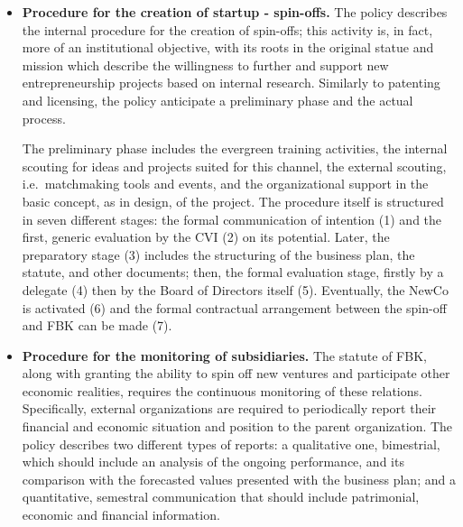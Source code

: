 \begin{itemize}
\item \textbf{Procedure for the creation of startup - spin-offs.} The policy describes the internal procedure for the creation of spin-offs; this activity is, in fact, more of an institutional objective, with its roots in the original statue and mission which describe the willingness to further and support new entrepreneurship projects based on internal research. Similarly to patenting and licensing, the policy anticipate a preliminary phase and the actual process.

The preliminary phase includes the evergreen training activities, the internal scouting for ideas and projects suited for this channel, the external scouting, i.e.\ matchmaking tools and events, and the organizational support in the basic concept, as in design, of the project. The procedure itself is structured in seven different stages: the formal communication of intention (1) and the first, generic evaluation by the CVI (2) on its potential. Later, the preparatory stage (3) includes the structuring of the business plan, the statute, and other documents; then, the formal evaluation stage, firstly by a delegate (4) then by the Board of Directors itself (5). Eventually, the NewCo is activated (6) and the formal contractual arrangement between the spin-off and FBK can be made (7).

\item \textbf{Procedure for the monitoring of subsidiaries.} The statute of FBK, along with granting the ability to spin off new ventures and participate other economic realities, requires the continuous monitoring of these relations. Specifically, external organizations are required to periodically report their financial and economic situation and position to the parent organization. The policy describes two different types of reports: a qualitative one, bimestrial, which should include an analysis of the ongoing performance, and its comparison with the forecasted values presented with the business plan; and a quantitative, semestral communication that should include patrimonial, economic and financial information.

\end{itemize} 